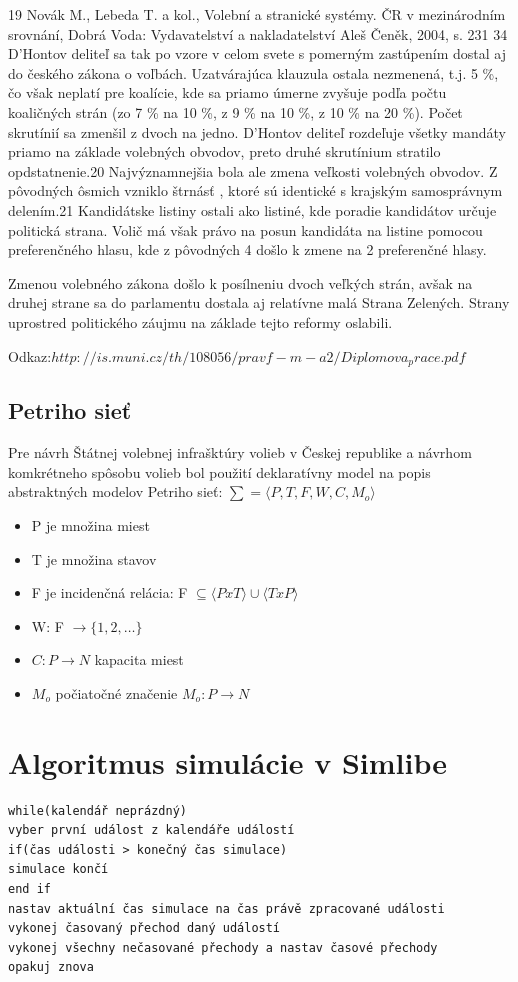 \documentclass[12pt,a4paper,titlepage,final]{article}
\begin{document}
19
 Novák M., Lebeda T. a kol., Volební a stranické systémy. ČR v mezinárodním srovnání, 
Dobrá Voda: Vydavatelství a nakladatelství Aleš Čeněk, 2004, s. 231 
  34
D'Hontov deliteľ sa tak po vzore v celom svete s pomerným zastúpením 
dostal aj do českého zákona o voľbách. Uzatvárajúca klauzula ostala 
nezmenená, t.j. 5 \%, čo však neplatí pre koalície, kde sa priamo úmerne 
zvyšuje podľa počtu koaličných strán (zo 7 \% na 10 \%, z 9 \% na 10 \%, z 10 
\% na 20 \%). Počet skrutínií sa zmenšil z dvoch na jedno. D'Hontov deliteľ 
rozdeľuje všetky mandáty priamo na základe volebných obvodov, preto 
druhé skrutínium stratilo opdstatnenie.20
 Najvýznamnejšia bola ale zmena 
veľkosti volebných obvodov. Z pôvodných ôsmich vzniklo štrnásť , ktoré sú 
identické s krajským samosprávnym delením.21
 Kandidátske listiny ostali 
ako listiné, kde poradie kandidátov určuje politická strana. Volič má však 
právo na posun kandidáta na listine pomocou preferenčného hlasu, kde 
z pôvodných 4 došlo k zmene na 2 preferenčné hlasy. 
 
Zmenou volebného zákona došlo k posílneniu dvoch veľkých strán, 
avšak na druhej strane sa do parlamentu dostala aj relatívne malá Strana 
Zelených. Strany uprostred politického záujmu na základe tejto reformy 
oslabili. 

Odkaz:$http://is.muni.cz/th/108056/pravf-m-a2/Diplomova_prace.pdf$


\subsection{Petriho sieť}
Pre návrh Štátnej volebnej infrašktúry volieb v Českej republike a návrhom komkrétneho spôsobu volieb bol použití deklaratívny model na popis abstraktných modelov Petriho sieť:
$
\sum = \langle P,T,F,W,C, M_o \rangle
$
\begin{itemize}
\item P je množina miest
\item T je množina stavov
\item F je incidenčná relácia: F $\subseteq \langle P x T \rangle \cup \langle T x P \rangle$ 
\item W: F $\rightarrow \{ 1,2, \dots \}  $
\item $C: P \rightarrow N$ kapacita miest
\item $M_o$ počiatočné značenie $M_o: P \rightarrow N$
\end{itemize}
\section{Algoritmus simulácie v Simlibe}
\begin{verbatim}
while(kalendář neprázdný)
vyber první událost z kalendáře událostí
if(čas události > konečný čas simulace)
simulace končí
end if
nastav aktuální čas simulace na čas právě zpracované události
vykonej časovaný přechod daný událostí
vykonej všechny nečasované přechody a nastav časové přechody
opakuj znova
\end{verbatim}
\end{document}

